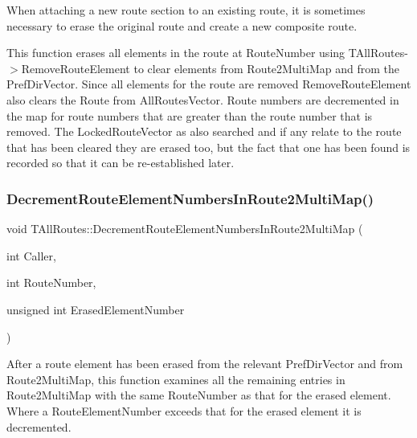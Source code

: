 When attaching a new route section to an existing route, it is sometimes necessary to erase the original route and create a new composite route.

This function erases all elements in the route at Route\+Number using T\+All\+Routes-\/$>$Remove\+Route\+Element to clear elements from Route2\+Multi\+Map and from the Pref\+Dir\+Vector. Since all elements for the route are removed Remove\+Route\+Element also clears the Route from All\+Routes\+Vector. Route numbers are decremented in the map for route numbers that are greater than the route number that is removed. The Locked\+Route\+Vector as also searched and if any relate to the route that has been cleared they are erased too, but the fact that one has been found is recorded so that it can be re-\/established later. \mbox{\label{class_t_all_routes_a5ebf1d3fbba09f98acc23b7d18822e9e}} 
\subsubsection{\texorpdfstring{Decrement\+Route\+Element\+Numbers\+In\+Route2\+Multi\+Map()}{DecrementRouteElementNumbersInRoute2MultiMap()}}
{\footnotesize\ttfamily void T\+All\+Routes\+::\+Decrement\+Route\+Element\+Numbers\+In\+Route2\+Multi\+Map (\begin{DoxyParamCaption}\item[{int}]{Caller,  }\item[{int}]{Route\+Number,  }\item[{unsigned int}]{Erased\+Element\+Number }\end{DoxyParamCaption})}

After a route element has been erased from the relevant Pref\+Dir\+Vector and from Route2\+Multi\+Map, this function examines all the remaining entries in Route2\+Multi\+Map with the same Route\+Number as that for the erased element. Where a Route\+Element\+Number exceeds that for the erased element it is decremented. \mbox{\label{class_t_all_routes_a5b18fe89f84962fca0a86063043b2a75}} 
